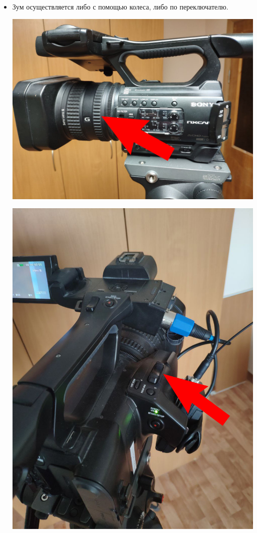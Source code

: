\begin{itemize}
  \item Зум осуществляется либо с помощью колеса, либо по переключателю.

        \begin{minipage}[c]{0.5\textwidth}
          \includegraphics[width=\textwidth]{Images/PortableCamera/recording/zoom-switcher.jpg}
        \end{minipage}
        \hfill
        \begin{minipage}[c]{0.4\textwidth}
          \includegraphics[width=\textwidth]{Images/PortableCamera/recording/zoom-bottom.jpg}
        \end{minipage}


\end{itemize}
